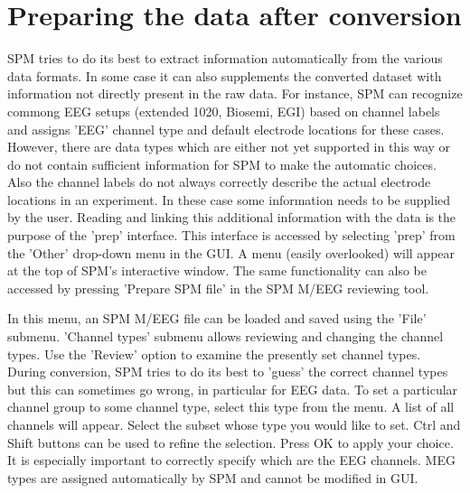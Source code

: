 \section{Preparing the data after conversion}
SPM tries to do its best to extract information automatically
from the various data formats. In some case it can also supplements
the converted dataset with information not directly present in the raw data.
For instance, SPM can recognize commong EEG setups (extended 1020, Biosemi, EGI)
based on channel labels and assigns 'EEG' channel type and default electrode locations
for these cases. However, there are data types which are either not yet supported in this way
or do not contain sufficient information for SPM to make the automatic choices.
Also the channel labels do not always correctly describe the actual electrode
locations in an experiment. In these case some information needs 
to be supplied by the user. Reading and linking this additional information with the data is the
purpose of the 'prep' interface. This interface is accessed by
selecting 'prep' from the 'Other' drop-down menu in the GUI.  A menu
(easily overlooked) will appear at the top of SPM's interactive 
window. The same functionality can also be accessed by pressing 'Prepare SPM file' in
the SPM M/EEG reviewing tool.

In this menu, an SPM M/EEG file can be loaded and saved using the 'File'
submenu. 'Channel types' submenu allows reviewing and
changing the channel types. Use the 'Review' option to examine the
presently set channel types. During conversion, SPM tries to do its
best to 'guess' the correct channel types but this can sometimes go
wrong, in particular for EEG data. To set a particular channel group
to some channel type, select this type from the menu. A list of all
channels will appear. Select the subset whose type you would like to
set. Ctrl and Shift buttons can be used to refine the selection. Press
OK to apply your choice. It is especially important to correctly specify
which are the EEG channels. MEG types are assigned automatically by SPM
and cannot be modified in GUI.  

